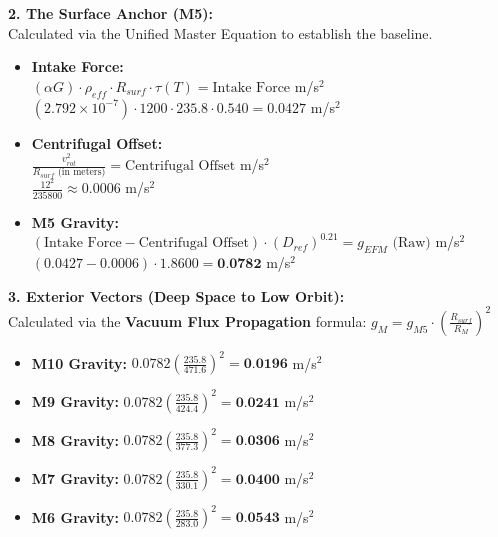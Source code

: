 \documentclass[11pt, a4paper]{article}
\begin{document}
  \vspace{1.0em}
  \noindent \textbf{2. The Surface Anchor (M5):} \\
  \hspace*{1em} Calculated via the Unified Master Equation to establish the baseline.
  \begin{itemize}
    \item \textbf{Intake Force:} \\[0.5em]
    \hspace*{2em} $(\alpha G) \cdot \rho_{eff} \cdot R_{surf} \cdot \tau(T) = \text{Intake Force}$ m/s$^2$ \\[1em]
    \hspace*{2em} $(2.792 \times 10^{-7}) \cdot 1200 \cdot 235.8 \cdot 0.540 = 0.0427$ m/s$^2$
    
    \item \textbf{Centrifugal Offset:} \\[0.5em]
    \hspace*{2em} $\frac{v_{rot}^2}{R_{surf} \text{ (in meters)}} = \text{Centrifugal Offset}$ m/s$^2$ \\[1em]
    \hspace*{2em} $\frac{12^2}{235800} \approx 0.0006$ m/s$^2$
    
    \item \textbf{M5 Gravity:} \\[0.5em]
    \hspace*{2em} $(\text{Intake Force} - \text{Centrifugal Offset}) \cdot (D_{ref})^{0.21} = g_{EFM} \text{ (Raw)}$ m/s$^2$ \\[1em]
    \hspace*{2em} $(0.0427 - 0.0006) \cdot 1.8600 = \textbf{0.0782}$ m/s$^2$
  \end{itemize}

  \clearpage
  \noindent \textbf{3. Exterior Vectors (Deep Space to Low Orbit):} \\
  \hspace*{1em} Calculated via the \textbf{Vacuum Flux Propagation} formula: $g_M = g_{M5} \cdot \left( \frac{R_{surf}}{R_M} \right)^2$
  \begin{itemize}
    \item \textbf{M10 Gravity:} $0.0782 \left( \frac{235.8}{471.6} \right)^2 = \textbf{0.0196}$ m/s$^2$
    \item \textbf{M9 Gravity:} $0.0782 \left( \frac{235.8}{424.4} \right)^2 = \textbf{0.0241}$ m/s$^2$
    \item \textbf{M8 Gravity:} $0.0782 \left( \frac{235.8}{377.3} \right)^2 = \textbf{0.0306}$ m/s$^2$
    \item \textbf{M7 Gravity:} $0.0782 \left( \frac{235.8}{330.1} \right)^2 = \textbf{0.0400}$ m/s$^2$
    \item \textbf{M6 Gravity:} $0.0782 \left( \frac{235.8}{283.0} \right)^2 = \textbf{0.0543}$ m/s$^2$
  \end{itemize}
\end{document}

